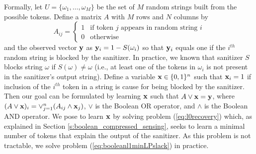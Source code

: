 Formally, let $U=\{\omega_1,\ldots,\omega_M\}$ be the set of $M$ random strings built from the possible tokens.  Define a matrix $A$ with $M$ rows and $N$ columns by 
\[A_{ij}=
\begin{cases} 1 &\mbox{if token } j \mbox{ appears in random string } i \\
0 & \mbox{otherwise}
\end{cases} 
\]
and the observed vector $\mathbf{y}$ as $\mathbf{y}_i=1-S(\omega_i)$ so that $\mathbf{y}_i$ equals one if the $i^{th}$ random string is blocked by the sanitizer.  In practice, we known that sanitizer $S$ blocks string $\omega$ if $S(\omega)\neq\omega$ (i.e., at least one of the tokens in $\omega_i$ is not present in the sanitizer's output string).  Define a variable $\mathbf{x}\in\{0,1\}^n$ such that $\mathbf{x}_i=1$ if inclusion of the $i^{th}$ token in a string is cause for being blocked by the sanitizer.  Then our goal can be formulated by learning $\mathbf{x}$ such that $A\vee \mathbf{x}=\mathbf{y}$, where $(A\vee \mathbf{x})_i=\vee_{j=1}^n(A_{ij}\wedge \mathbf{x}_j)$, $\vee$ is the Boolean OR operator, and $\wedge$ is the Boolean AND operator.  We pose to learn $\mathbf{x}$ by solving problem (\ref{eq:l0recovery}) which, as explained in Section \ref{s:boolean_compressed_sensing}, seeks to learn a minimal number of tokens that explain the output of the sanitizer. As this problem is not tractable, we solve problem (\ref{eq:booleanl1minLPslack}) in practice. 


